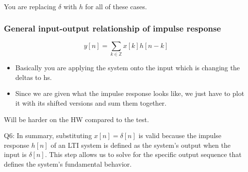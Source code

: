 \begin{warning}
    You are replacing $\delta$ with $h$ for all of these cases.
\end{warning}

\subsubsection{General input-output relationship of impulse response}
\begin{definition}
    \begin{equation}
        y[n] = \sum_{k \in \mathbb{Z}} x[k] h[n-k]
    \end{equation}
\end{definition}

\begin{example}
    \begin{itemize}
        \item Basically you are applying the system onto the input which is changing the deltas to hs. 
        \item Since we are given what the impulse response looks like, we just have to plot it with its shifted versions and sum them together.
    \end{itemize}
\end{example}

\begin{warning}
    Will be harder on the HW compared to the test. 
\end{warning}

\begin{intuition}
    Q6: In summary, substituting \( x[n] = \delta[n] \) is valid because the impulse response \( h[n] \) of an LTI system is defined as the system's output when the input is \( \delta[n] \). This step allows us to solve for the specific output sequence that defines the system's fundamental behavior.
\end{intuition}




